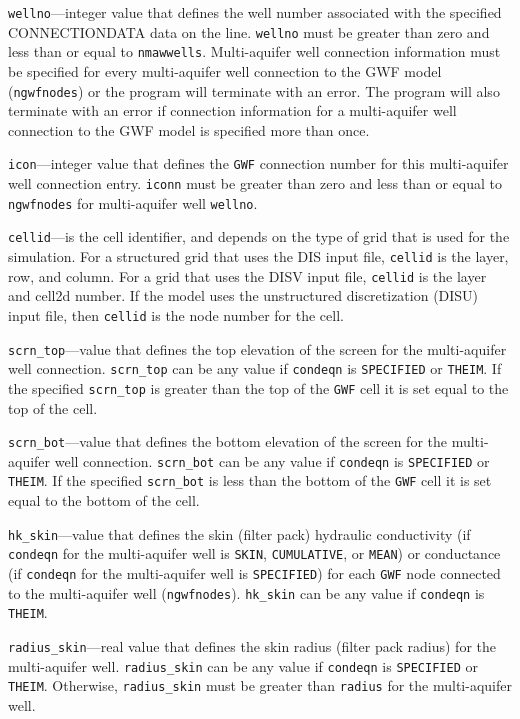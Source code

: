 \begin{description}
\item \texttt{wellno}---integer value that defines the well number associated with the specified CONNECTIONDATA data on the line. \texttt{wellno} must be greater than zero and less than or equal to \texttt{nmawwells}. Multi-aquifer well connection information must be specified for every multi-aquifer well connection to the GWF model (\texttt{ngwfnodes}) or the program will terminate with an error.  The program will also terminate with an error if connection information for a multi-aquifer well connection to the GWF model is specified more than once.

\item \texttt{icon}---integer value that defines the \texttt{GWF} connection number for this multi-aquifer well connection entry. \texttt{iconn} must be greater than zero and less than or equal to \texttt{ngwfnodes} for multi-aquifer well \texttt{wellno}.

\item \texttt{cellid}---is the cell identifier, and depends on the type of grid that is used for the simulation.  For a structured grid that uses the DIS input file, \texttt{cellid} is the layer, row, and column.   For a grid that uses the DISV input file, \texttt{cellid} is the layer and cell2d number.  If the model uses the unstructured discretization (DISU) input file, then \texttt{cellid} is the node number for the cell.

\item \texttt{scrn\_top}---value that defines the top elevation of the screen for the multi-aquifer well connection.  \texttt{scrn\_top} can be any value if \texttt{condeqn} is \texttt{SPECIFIED} or \texttt{THEIM}. If the specified \texttt{scrn\_top} is greater than the top of the \texttt{GWF} cell it is set equal to the top of the cell.

\item \texttt{scrn\_bot}---value that defines the bottom elevation of the screen for the multi-aquifer well connection.  \texttt{scrn\_bot} can be any value if \texttt{condeqn} is \texttt{SPECIFIED} or \texttt{THEIM}. If the specified \texttt{scrn\_bot} is less than the bottom of the \texttt{GWF} cell it is set equal to the bottom of the cell.

\item \texttt{hk\_skin}---value that defines the skin (filter pack) hydraulic conductivity (if \texttt{condeqn} for the multi-aquifer well is \texttt{SKIN}, \texttt{CUMULATIVE}, or \texttt{MEAN}) or conductance (if \texttt{condeqn} for the multi-aquifer well is \texttt{SPECIFIED}) for each \texttt{GWF} node connected to the multi-aquifer well (\texttt{ngwfnodes}). \texttt{hk\_skin} can be any value if \texttt{condeqn} is \texttt{THEIM}.

\item \texttt{radius\_skin}---real value that defines the skin radius (filter pack radius) for the multi-aquifer well. \texttt{radius\_skin} can be any value if \texttt{condeqn} is \texttt{SPECIFIED} or \texttt{THEIM}. Otherwise, \texttt{radius\_skin} must be greater than \texttt{radius} for the multi-aquifer well.

\end{description}
